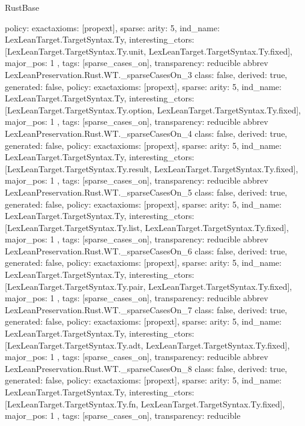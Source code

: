 \begin{lexlean}{RustBase}
\begin{coremodule}
{  policy: exact{axioms: [propext]},
  sparse: {
    arity: 5,
    ind_name: LexLeanTarget.TargetSyntax.Ty,
    interesting_ctors: [LexLeanTarget.TargetSyntax.Ty.unit, LexLeanTarget.TargetSyntax.Ty.fixed],
    major_pos: 1
  },
  tags: [sparse_cases_on],
  transparency: reducible
}
abbrev LexLeanPreservation.Rust.WT._sparseCasesOn_3 {
  class: false,
  derived: true,
  generated: false,
  policy: exact{axioms: [propext]},
  sparse: {
    arity: 5,
    ind_name: LexLeanTarget.TargetSyntax.Ty,
    interesting_ctors: [LexLeanTarget.TargetSyntax.Ty.option, LexLeanTarget.TargetSyntax.Ty.fixed],
    major_pos: 1
  },
  tags: [sparse_cases_on],
  transparency: reducible
}
abbrev LexLeanPreservation.Rust.WT._sparseCasesOn_4 {
  class: false,
  derived: true,
  generated: false,
  policy: exact{axioms: [propext]},
  sparse: {
    arity: 5,
    ind_name: LexLeanTarget.TargetSyntax.Ty,
    interesting_ctors: [LexLeanTarget.TargetSyntax.Ty.result, LexLeanTarget.TargetSyntax.Ty.fixed],
    major_pos: 1
  },
  tags: [sparse_cases_on],
  transparency: reducible
}
abbrev LexLeanPreservation.Rust.WT._sparseCasesOn_5 {
  class: false,
  derived: true,
  generated: false,
  policy: exact{axioms: [propext]},
  sparse: {
    arity: 5,
    ind_name: LexLeanTarget.TargetSyntax.Ty,
    interesting_ctors: [LexLeanTarget.TargetSyntax.Ty.list, LexLeanTarget.TargetSyntax.Ty.fixed],
    major_pos: 1
  },
  tags: [sparse_cases_on],
  transparency: reducible
}
abbrev LexLeanPreservation.Rust.WT._sparseCasesOn_6 {
  class: false,
  derived: true,
  generated: false,
  policy: exact{axioms: [propext]},
  sparse: {
    arity: 5,
    ind_name: LexLeanTarget.TargetSyntax.Ty,
    interesting_ctors: [LexLeanTarget.TargetSyntax.Ty.pair, LexLeanTarget.TargetSyntax.Ty.fixed],
    major_pos: 1
  },
  tags: [sparse_cases_on],
  transparency: reducible
}
abbrev LexLeanPreservation.Rust.WT._sparseCasesOn_7 {
  class: false,
  derived: true,
  generated: false,
  policy: exact{axioms: [propext]},
  sparse: {
    arity: 5,
    ind_name: LexLeanTarget.TargetSyntax.Ty,
    interesting_ctors: [LexLeanTarget.TargetSyntax.Ty.adt, LexLeanTarget.TargetSyntax.Ty.fixed],
    major_pos: 1
  },
  tags: [sparse_cases_on],
  transparency: reducible
}
abbrev LexLeanPreservation.Rust.WT._sparseCasesOn_8 {
  class: false,
  derived: true,
  generated: false,
  policy: exact{axioms: [propext]},
  sparse: {
    arity: 5,
    ind_name: LexLeanTarget.TargetSyntax.Ty,
    interesting_ctors: [LexLeanTarget.TargetSyntax.Ty.fn, LexLeanTarget.TargetSyntax.Ty.fixed],
    major_pos: 1
  },
  tags: [sparse_cases_on],
  transparency: reducible
}
\end{coremodule}
\end{lexlean}
